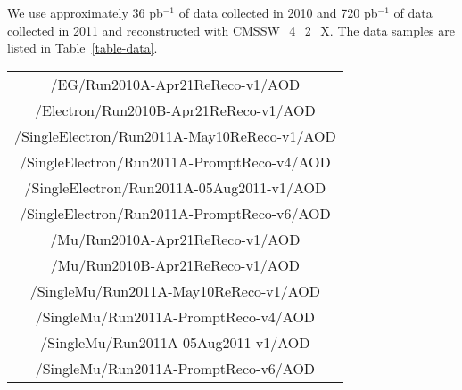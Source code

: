 We use approximately 36 pb$^{-1}$ of data collected in 2010 
and 720 pb$^{-1}$ of data collected in 2011 
and reconstructed with CMSSW\_4\_2\_X.
The data samples are listed in Table~\ref{table-data}.
\begin{table*}[hb]
\caption{
Data samples used in analysis.
}
\label{table-data}
\vspace*{\medskipamount}
\begin{center}
\small
\begin{tabular}{|c|}
\hline
/EG/Run2010A-Apr21ReReco-v1/AOD \\
/Electron/Run2010B-Apr21ReReco-v1/AOD \\
/SingleElectron/Run2011A-May10ReReco-v1/AOD \\
/SingleElectron/Run2011A-PromptReco-v4/AOD \\
/SingleElectron/Run2011A-05Aug2011-v1/AOD\\
/SingleElectron/Run2011A-PromptReco-v6/AOD\\
\hline
/Mu/Run2010A-Apr21ReReco-v1/AOD \\ 
/Mu/Run2010B-Apr21ReReco-v1/AOD \\
/SingleMu/Run2011A-May10ReReco-v1/AOD\\
/SingleMu/Run2011A-PromptReco-v4/AOD\\
/SingleMu/Run2011A-05Aug2011-v1/AOD\\
/SingleMu/Run2011A-PromptReco-v6/AOD\\
\hline
\end{tabular}
\end{center}
\end{table*}

 